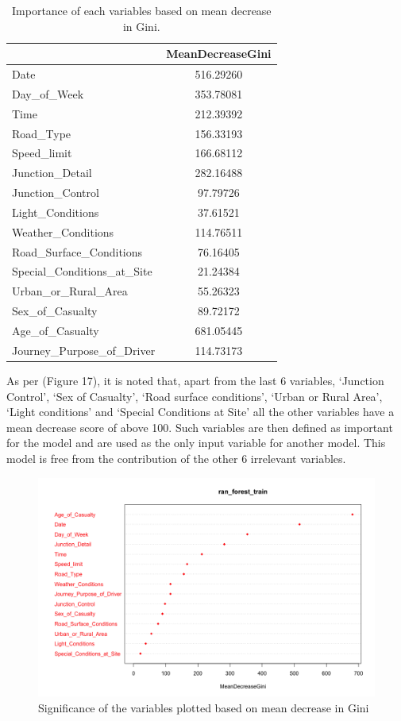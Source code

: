 \documentclass[
  a4paper,
]{article}
\begin{document}
\begin{table}[h]
\caption{Importance of each variables based on mean decrease in Gini.}
\bigskip
\centering
\begin{tabular}{l c}
\hline\hline
 & MeanDecreaseGini\\ [0.75ex]
\hline
Date                            &  516.29260\\
Day\_of\_Week                      & 353.78081\\
Time                              &212.39392\\
Road\_Type                       &  156.33193\\
Speed\_limit         &              166.68112\\
Junction\_Detail      &             282.16488\\
Junction\_Control      &             97.79726\\
Light\_Conditions       &            37.61521\\
Weather\_Conditions      &          114.76511\\
Road\_Surface\_Conditions  &          76.16405\\
Special\_Conditions\_at\_Site  &       21.24384\\
Urban\_or\_Rural\_Area          &      55.26323\\
Sex\_of\_Casualty               &     89.72172\\
Age\_of\_Casualty  &              681.05445\\
Journey\_Purpose\_of\_Driver     &     114.73173\\ [1ex]
\hline
\end{tabular}
\end{table}

As per (Figure 17), it is noted that, apart from the last 6 variables,
`Junction Control', `Sex of Casualty', `Road surface conditions', `Urban
or Rural Area', `Light conditions' and `Special Conditions at Site' all
the other variables have a mean decrease score of above 100. Such
variables are then defined as important for the model and are used as
the only input variable for another model. This model is free from the
contribution of the other 6 irrelevant variables.

\begin{figure}[h!]

{\centering \includegraphics[width=0.75\linewidth]{varimp} 

}

\caption{Significance of the variables plotted based on mean decrease in Gini}\label{fig:unnamed-chunk-18}
\end{figure}
\end{document}

